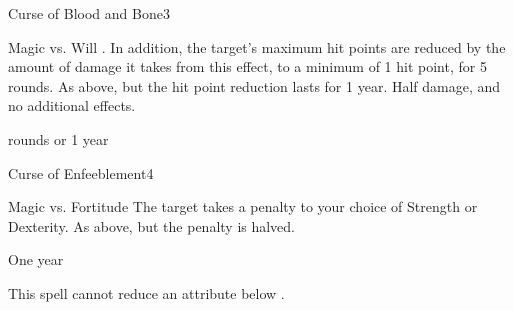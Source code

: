 \begin{spellsection}{Curse of Blood and Bone}{3}
    \begin{spellheader}
    \end{spellheader}
    \begin{spellcontent}
        \begin{spelltargetinginfo}
        \end{spelltargetinginfo}
        \begin{spelleffects}
            \begin{spellattack}{Magic vs. Will}
                \spellsuccess {}. In addition, the target's maximum hit points are reduced by the amount of damage it takes from this effect, to a minimum of 1 hit point, for 5 rounds.
                \spellcritical As above, but the hit point reduction lasts for 1 year.
                \spellfailure Half damage, and no additional effects.
            \end{spellattack}
             rounds or 1 year
        \end{spelleffects}
    \end{spellcontent}
    \begin{spellfooter}
        \spellnotes \cursespellnotes
        \miscastrandom
    \end{spellfooter}
\end{spellsection}

\begin{spellsection}{Curse of Enfeeblement}{4}
    \begin{spellheader}
    \end{spellheader}
    \begin{spellcontent}
        \begin{spelltargetinginfo}
        \end{spelltargetinginfo}
        \begin{spelleffects}
            \begin{spellattack}{Magic vs. Fortitude}
                \spellsuccess The target takes a  penalty to your choice of Strength or Dexterity.
                \spellfailure As above, but the penalty is halved.
            \end{spellattack}
            \spelldur One year
        \end{spelleffects}
    \end{spellcontent}
    \begin{spellfooter}
        \spellnotes This spell cannot reduce an attribute below . \cursespellnotes
        \miscastrandom
    \end{spellfooter}
\end{spellsection}

